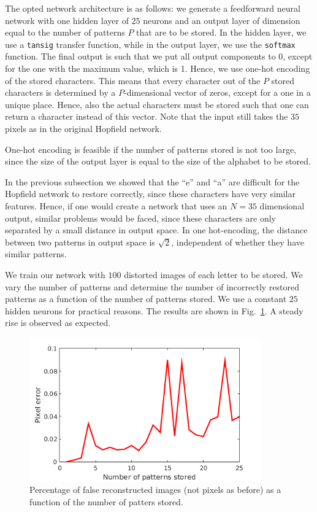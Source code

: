 \documentclass[pdftex,11pt,a4paper]{article}
\begin{document}
The opted network architecture is as follows: we generate a feedforward neural network with one hidden layer of $25$ neurons and an output layer of dimension equal to the number of patterns $P$ that are to be stored. In the hidden layer, we use a \texttt{tansig} transfer function, while in the output layer, we use the \texttt{softmax} function. The final output is such that we put all output components to 0, except for the one with the maximum value, which is 1. Hence, we use one-hot encoding of the stored characters. This means that every character out of the $P$ stored characters is determined by a $P$-dimensional vector of zeros, except for a one in a unique place. Hence, also the actual characters must be stored such that one can return a character instead of this vector.  Note that the input still takes the $35$ pixels as in the original Hopfield network.

One-hot encoding is feasible if the number of patterns stored is not too large, since the size of the output layer is equal to the size of the alphabet to be stored.

In the previous subsection we showed that the ``e'' and ``a'' are difficult for the Hopfield network to restore correctly, since these characters have very similar features. Hence, if one would create a network that uses an $N=35$ dimensional output, similar problems would be faced, since these characters are only separated by a small distance in output space. In one hot-encoding, the distance between two patterns in output space is $\sqrt{2}$, independent of whether they have similar patterns.

We train our network with $100$ distorted images of each letter to be stored. We vary the number of patterns and determine the number of incorrectly restored patterns as a function of the number of patterns stored. We use a constant $25$ hidden neurons for practical reasons. The results are shown in Fig.~\ref{fig:alternative_error}. A steady rise is observed as expected.
\begin{figure}
\centering
\includegraphics[width=10cm]{figs/alternative_error.png}
\caption{Percentage of false reconstructed images (not pixels as before) as a function of the number of patters stored.\label{fig:alternative_error}}
\end{figure}
\end{document}
